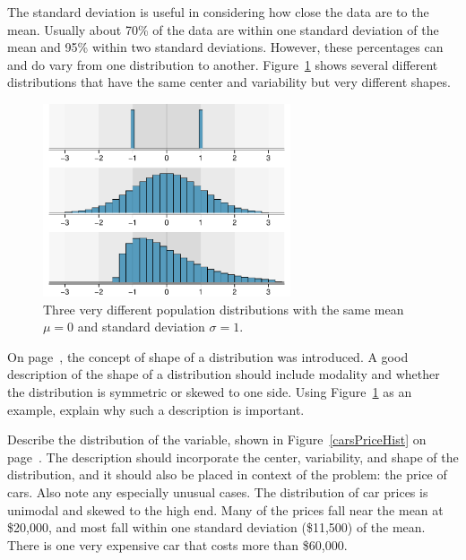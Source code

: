 The standard deviation is useful in considering how close the data are to the mean. Usually about 70\% of the data are within one standard deviation of the mean and 95\% within two standard deviations. However, these percentages can and do vary from one distribution to another. Figure~\ref{severalDiffDistWithSdOf1} shows several different distributions that have the same center and variability but very different shapes.
\begin{figure}
\centering
\includegraphics[width=0.65\textwidth]{01/figures/severalDiffDistWithSdOf1/severalDiffDistWithSdOf1}
\caption{Three very different population distributions with the same mean $\mu=0$ and standard deviation $\sigma=1$.\vspace{-3mm}}
\label{severalDiffDistWithSdOf1}
\end{figure}

\begin{exercise}
On page~\pageref{shapeFirstDiscussed}, the concept of shape of a distribution was introduced. A good description of the shape of a distribution should include modality and whether the distribution is symmetric or skewed to one side. Using Figure~\ref{severalDiffDistWithSdOf1} as an example, explain why such a description is important.
\end{exercise}

\begin{example}{Describe the distribution of the  variable, shown in Figure~\ref{carsPriceHist} on page~\pageref{carsPriceHist}. The description should incorporate the center, variability, and shape of the distribution, and it should also be placed in context of the problem: the price of cars. Also note any especially unusual cases.}
The distribution of car prices is unimodal and skewed to the high end. Many of the prices fall near the mean at \$20,000, and most fall within one standard deviation (\$11,500) of the mean. There is one very expensive car that costs more than \$60,000.
\end{example}

